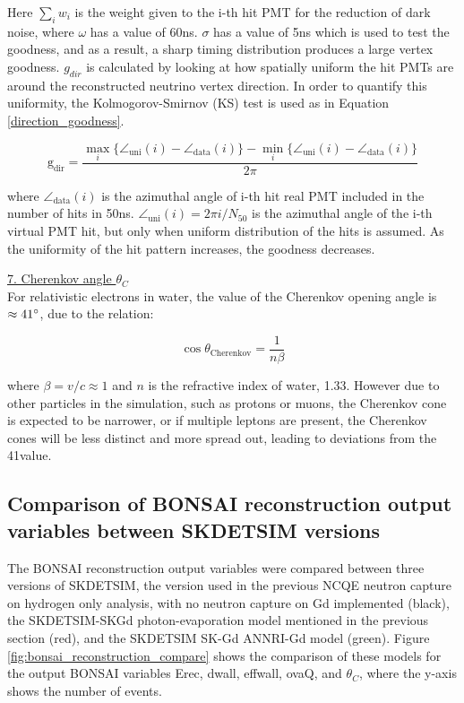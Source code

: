 Here $\sum_{i} w_{i}$ is the weight given to the i-th hit PMT for the reduction of dark noise, where $\omega$ has a value of 60ns. $\sigma$ has a value of 5ns which is used to test the goodness, and as a result, a sharp timing distribution produces a large vertex goodness. $g_{dir}$ is calculated by looking at how spatially uniform the hit PMTs are around the reconstructed neutrino vertex direction. In order to quantify this uniformity, the Kolmogorov-Smirnov (KS) test is used as in Equation \ref{direction_goodness}.

\begin{equation}
    \mathrm{g}_{\mathrm{dir}}=\frac{\max _{i}\{\angle_{\mathrm{uni}}(i)-\angle_{\mathrm{data}}(i)\}-\min _{i}\{\angle_{\mathrm{uni}}(i)-\angle_{\mathrm{data}}(i)\}}{2 \pi}
\label{direction_goodness}
\end{equation}

where $\angle_{\mathrm{data}}(i)$ is the azimuthal angle of i-th hit real PMT included in the number of hits in 50ns. $\angle_{\mathrm{uni}}(i)=2 \pi i / N_{50}$ is the azimuthal angle of the i-th virtual PMT hit, but only when uniform distribution of the hits is assumed. As the uniformity of the hit pattern increases, the goodness decreases. 
 


\noindent
\underline{7. Cherenkov angle $\theta_{C}$}\\
\noindent
 For relativistic electrons in water, the value of the Cherenkov opening angle is $\approx 41\degree$, due to the relation: 

 \begin{equation}
\cos \theta_{\mathrm{Cherenkov}}=\frac{1}{n\beta}
\label{cherenkov_angle}
\end{equation}
 
where $\beta = v/c \approx 1$ and $n$ is the refractive index of water, 1.33. However due to other particles in the simulation, such as protons or muons, the Cherenkov cone is expected to be narrower, or if multiple leptons are present, the Cherenkov cones will be less distinct and more spread out, leading to deviations from the 41\degree value. 

\subsection{Comparison of BONSAI reconstruction output variables between SKDETSIM versions}

The BONSAI reconstruction output variables were compared between three versions of SKDETSIM, the version used in the previous NCQE neutron capture on hydrogen only analysis, with no neutron capture on Gd implemented (black), the SKDETSIM-SKGd photon-evaporation model mentioned in the previous section (red), and the SKDETSIM SK-Gd ANNRI-Gd model (green). Figure \ref{fig:bonsai_reconstruction_compare} shows the comparison of these models for the output BONSAI variables Erec, dwall, effwall, ovaQ, and $\theta_C$, where the y-axis shows the number of events.

